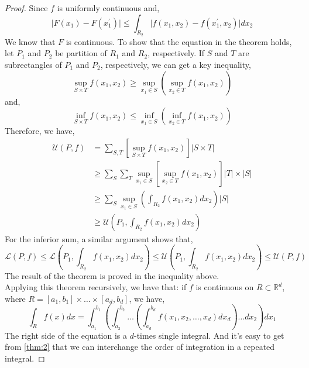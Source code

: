 \documentclass[a4paper]{article}
\numberwithin{equation}{subsection}
\begin{document}
\begin{proof}
    Since $f$ is uniformly continuous and,
    \begin{equation}
        \lvert F(x_1) - F(x_1^\prime) \rvert \leq \int_{R_2} \lvert f(x_1, x_2) - f(x_1^\prime, x_2) \rvert dx_2
    \end{equation}
    We know that $F$ is continuous. To show that the equation in the theorem holds, let $P_1$ and $P_2$ be partition of $R_1$ and $R_2$, respectively. If $S$ and $T$ are subrectangles of $P_1$ and $P_2$, respectively, we can get a key inequality,
    \begin{equation}
        \sup_{S \times T} f(x_1, x_2) \geq \sup_{x_1 \in S}(\sup_{x_2 \in T} f(x_1, x_2))
    \end{equation}
    and,
    \begin{equation}
        \inf_{S \times T} f(x_1, x_2) \leq \inf_{x_1 \in S}(\inf_{x_2 \in T} f(x_1, x_2))
    \end{equation}
    Therefore, we have,
    \begin{align}
        \mathcal{U}(P, f) &= \sum_{S, T} [\sup_{S \times T} f(x_1, x_2)] \lvert S \times T \rvert \\
                          &\geq \sum_{S} \sum_{T} \sup_{x_1 \in S} [\sup_{x_2 \in T} f(x_1, x_2)] \lvert T \rvert \times \lvert S \rvert \\
                          &\geq \sum_{S} \sup_{x_1 \in S} (\int_{R_2} f(x_1, x_2) dx_2) \lvert S \rvert \\
                          &\geq \mathcal{U}(P_1, \int_{R_2} f(x_1, x_2) dx_2)
    \end{align}
    For the inferior sum, a similar argument shows that,
    \begin{equation}
        \mathcal{L}(P, f) \leq \mathcal{L}(P_1, \int_{R_2} f(x_1, x_2) dx_2) \leq \mathcal{U} (P_1, \int_{R_2} f(x_1, x_2) dx_2) \leq \mathcal{U} (P, f)
    \end{equation}
    The result of the theorem is proved in the inequality above. \\
    Applying this theorem recursively, we have that: if $f$ is continuous on $R \subset \mathbb{R}^d$, where $R=[a_1, b_1]\times\dots\times[a_d, b_d]$, we have,
    \begin{equation}
        \int_R f(x)dx = \int_{a_1}^{b_1} ( \int_{a_2}^{b_2} \dots (\int_{a_d}^{b_d} f(x_1, x_2, \dots, x_d) dx_d) \dots dx_2 ) dx_1
    \end{equation}
    The right side of the equation is a $d$-times single integral. And it's easy to get from \cref{thm:2} that we can interchange the order of integration in a repeated integral.
\end{proof}
\end{document}
